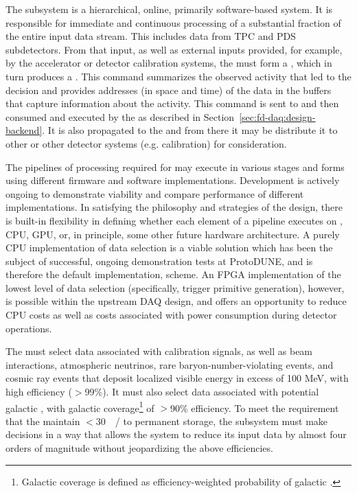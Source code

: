 The  subsystem is a hierarchical, online, primarily
software-based system. It is responsible for immediate and continuous processing of a substantial fraction of the entire input data stream. 
This includes data from TPC and PDS subdetectors.
From that input, as well as external inputs provided, for example, by
the accelerator or detector calibration systems, the  must form a ,
which in turn produces a .
This command summarizes the observed activity that led to the decision
and provides addresses (in space and time) of the data in the  buffers that capture information about the activity.
This command is sent to and then consumed and executed by the  as described in Section~\ref{sec:fd-daq:design-backend}. 
It is also propagated to the  and from there it may be
distribute it to other  or other detector systems
(e.g. calibration) for consideration.

The pipelines of processing required for  may execute in
various stages and forms using different firmware and software
implementations. 
Development is actively ongoing to demonstrate
viability and compare performance of different implementations. In satisfying
the philosophy and strategies of the  design, there is built-in
flexibility in defining whether each element of a pipeline executes on
, CPU, GPU, or, in principle, some other future hardware
architecture. A purely CPU implementation of data selection is a viable
solution which has been the subject of successful, ongoing demonstration
tests at ProtoDUNE, and is therefore the default implementation,
scheme. An FPGA implementation of the lowest level of data selection
(specifically, trigger primitive generation), 
however, is possible within the upstream DAQ design, and offers an
opportunity to reduce CPU costs as well as costs associated with power
consumption during detector operations. 

The  must select data associated with calibration
signals, as well as beam interactions,
atmospheric neutrinos, rare baryon-number-violating events, and cosmic
ray events that deposit localized visible energy in excess of 100 MeV, with high efficiency ($>$99\%). 
It must also select data associated with potential galactic , with galactic coverage\footnote{Galactic coverage is defined as efficiency-weighted probability of galactic .} of $>$90\% efficiency.
To meet the requirement that the   maintain
$<$\SI{30}{\peta\byte/\year} to permanent storage, the 
subsystem must make  decisions in a way that allows the  
system to reduce its input data by almost four orders of magnitude
without jeopardizing the above efficiencies.

